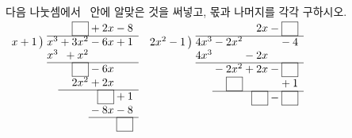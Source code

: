 다음 나눗셈에서 \blank\ 안에 알맞은 것을 써넣고, 몫과 나머지를 각각 구하시오.
 {\renewcommand{\arraystretch}{1.3}$\begin{array}[t]{r@{\;}r@{}r@{}r@{}r} & & \blank & {}+2x & {}-8 \\ \cline{2-5} x+1\mkern3mu \big) & x^3 & {}+3x^2 & {}-6x & {}+1 \\ & x^3 & {}+x^2 & & \\ \cline{2-5} & & \blank & {}-6x & \\ & & 2x^2 & {}+2x & \\ \cline{3-5} & & & \blank & {}+1 \\ & & & {}-8x & {}-8 \\ \cline{4-5} & & & & \blank \end{array}$}
 {\renewcommand{\arraystretch}{1.3}$\begin{array}[t]{r@{\;}r@{}r@{}r@{}r} & & & 2x & {}-\blank \\ \cline{2-5} 2x^2-1\mkern3mu \big) & 4x^3 & {}-2x^2 & & {}-4 \\ & 4x^3 & & {}-2x & \\ \cline{2-5} & & {}-2x^2 & {}+2x & {}-\blank \\ & & \blank & & {}+1 \\ \cline{3-5} & & & \blank & {}-\blank \end{array}$}
